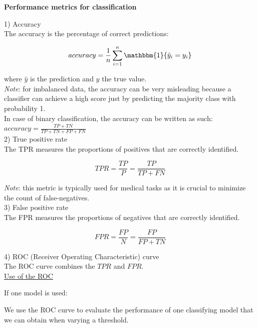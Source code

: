 {\fontsize{12pt}{22pt} \textbf{Performance metrics for classification}\par}

\vspace{5mm}

1) Accuracy \\

The accuracy is the percentage of correct predictions:

$$accuracy = \frac{1}{n} \sum_{i=1}^{n} \mathbbm{1} \{\hat y_i = y_i \}$$

where $\hat y$ is the prediction and $y$ the true value. \\

\textit{Note}: for imbalanced data, the accuracy can be very misleading because a classifier can achieve a high score just by predicting the majority class with probability 1. \\

In case of binary classification, the accuracy can be written as such: $accuracy = \frac{TP + TN}{TP + TN + FP + FN}$ \\

2) True positive rate \\

The TPR measures the proportions of positives that are correctly identified.

$$TPR = \frac{TP}{P} = \frac{TP}{TP + FN}$$

\textit{Note}: this metric is typically used for medical tasks as it is crucial to minimize the count of false-negatives. \\

3) False positive rate \\

The FPR measures the proportions of negatives that are correctly identified.

$$FPR = \frac{FP}{N} = \frac{FP}{FP + TN}$$

4) ROC (Receiver Operating Characteristic) curve \\

The ROC curve combines the $TPR$ and $FPR$.\\

\underline{Use of the ROC}

\vspace{5mm}

If one model is used:

We use the ROC curve to evaluate the performance of one classifying model that we can obtain when varying a threshold.


